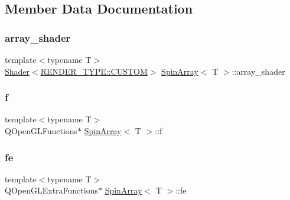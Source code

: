 \subsection{Member Data Documentation}
\mbox{\label{classSpinArray_a3878164b21186d502b07721b33d18c6c}} 
\subsubsection{\texorpdfstring{array\+\_\+shader}{array\_shader}}
{\footnotesize\ttfamily template$<$typename T$>$ \\
\mbox{\hyperlink{classShader}{Shader}}$<$\mbox{\hyperlink{shader__class_8hpp_a24e288e18eb7b6e01de7565001fedb60a72baef04098f035e8a320b03ad197818}{R\+E\+N\+D\+E\+R\+\_\+\+T\+Y\+P\+E\+::\+C\+U\+S\+T\+OM}}$>$ \mbox{\hyperlink{classSpinArray}{Spin\+Array}}$<$ T $>$\+::array\+\_\+shader\hspace{0.3cm}{\ttfamily [private]}}

\mbox{\label{classSpinArray_aac548e72694311f016d7b6fd0ba63be3}} 
\subsubsection{\texorpdfstring{f}{f}}
{\footnotesize\ttfamily template$<$typename T$>$ \\
Q\+Open\+G\+L\+Functions$\ast$ \mbox{\hyperlink{classSpinArray}{Spin\+Array}}$<$ T $>$\+::f\hspace{0.3cm}{\ttfamily [private]}}

\mbox{\label{classSpinArray_adf7cfad121711467cfc5544753d16213}} 
\subsubsection{\texorpdfstring{fe}{fe}}
{\footnotesize\ttfamily template$<$typename T$>$ \\
Q\+Open\+G\+L\+Extra\+Functions$\ast$ \mbox{\hyperlink{classSpinArray}{Spin\+Array}}$<$ T $>$\+::fe\hspace{0.3cm}{\ttfamily [private]}}

